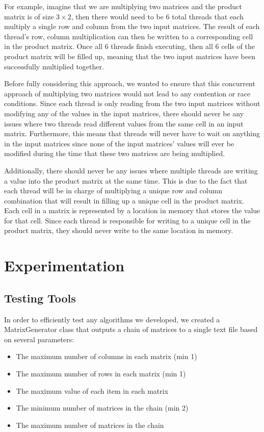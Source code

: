 \documentclass[conference,leqno]{IEEEtran}
\begin{document}
For example, imagine that we are multiplying two matrices and the product matrix is of size $3 \times 2$, then there would need to be $6$ total threads that each multiply a single row and column from the two input matrices. The result of each thread’s row, column multiplication can then be written to a corresponding cell in the product matrix. Once all $6$ threads finish executing, then all $6$ cells of the product matrix will be filled up, meaning that the two input matrices have been successfully multiplied together.

Before fully considering this approach, we wanted to ensure that this concurrent approach of multiplying two matrices would not lead to any contention or race conditions. Since each thread is only reading from the two input matrices without modifying any of the values in the input matrices, there should never be any issues where two threads read different values from the same cell in an input matrix. Furthermore, this means that threads will never have to wait on anything in the input matrices since none of the input matrices’ values will ever be modified during the time that these two matrices are being multiplied.

Additionally, there should never be any issues where multiple threads are writing a value into the product matrix at the same time. This is due to the fact that each thread will be in charge of multiplying a unique row and column combination that will result in filling up a unique cell in the product matrix. Each cell in a matrix is represented by a location in memory that stores the value for that cell. Since each thread is responsible for writing to a unique cell in the product matrix, they should never write to the same location in memory.

\section{Experimentation}

\subsection{Testing Tools}
In order to efficiently test any algorithms we developed, we created a MatrixGenerator class that outputs a chain of matrices to a single text file based on several parameters:

\begin{itemize}
    \item The maximum number of columns in each matrix (min 1)
    \item The maximum number of rows in each matrix (min 1)
    \item The maximum value of each item in each matrix
    \item The minimum number of matrices in the chain (min 2)
    \item The maximum number of matrices in the chain
\end{itemize}
\end{document}
